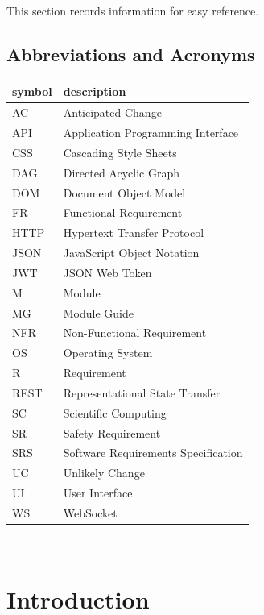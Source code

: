 \documentclass[12pt, titlepage]{article}
\begin{document}
This section records information for easy reference.

\subsection{Abbreviations and Acronyms}

\renewcommand{\arraystretch}{1.2}
\begin{tabular}{l l} 
  \toprule		
  \textbf{symbol} & \textbf{description}\\
  \midrule 
  AC & Anticipated Change\\
  API & Application Programming Interface\\
  CSS & Cascading Style Sheets\\
  DAG & Directed Acyclic Graph \\
  DOM & Document Object Model\\
  FR & Functional Requirement\\
  HTTP & Hypertext Transfer Protocol\\
  JSON & JavaScript Object Notation\\
  JWT & JSON Web Token\\
  M & Module \\
  MG & Module Guide \\
  NFR & Non-Functional Requirement\\
  OS & Operating System \\
  R & Requirement\\
  REST & Representational State Transfer\\
  SC & Scientific Computing \\
  SR & Safety Requirement\\
  SRS & Software Requirements Specification\\
  UC & Unlikely Change \\
  UI & User Interface\\
  WS & WebSocket\\
  \bottomrule
\end{tabular}\\

\newpage

\tableofcontents

\listoftables

\listoffigures

\newpage


\section{Introduction}
\end{document}
